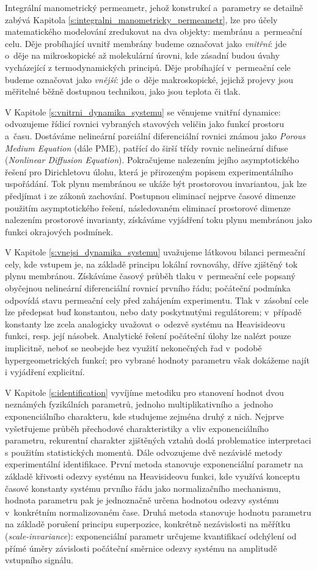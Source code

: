Integrální manometrický permeametr, jehož konstrukcí a~parametry se detailně zabývá Kapitola \ref{s:integralni_manometricky_permeametr}, lze pro účely matematického modelování zredukovat na dva objekty: membránu a~permeační celu. Děje probíhající uvnitř membrány budeme označovat jako \emph{vnitřní}: jde o~děje na mikroskopické až molekulární úrovni, kde zásadní budou úvahy vycházející z termodynamických principů. Děje probíhající v~permeační cele budeme označovat jako \emph{vnější}: jde o~děje makroskopické, jejichž projevy jsou měřitelné běžně dostupnou technikou, jako jsou teplota či tlak.

V Kapitole \ref{s:vnitrni_dynamika_systemu} se věnujeme vnitřní dynamice: odvozujeme řídicí rovnici vybraných stavových veličin jako funkcí prostoru a~času. Dostáváme nelineární parciální diferenciální rovnici známou jako \emph{Porous Medium Equation} (dále PME), patřící do širší třídy rovnic nelineární difuse (\emph{Nonlinear Diffusion Equation}). Pokračujeme nalezením jejího asymptotického řešení pro Dirichletovu úlohu, která je přirozeným popisem experimentálního uspořádání. Tok plynu membránou se ukáže být prostorovou invariantou, jak lze předjímat i ze zákonů zachování. Postupnou eliminací nejprve časové dimenze použitím asymptotického řešení, následovaném eliminací prostorové dimenze nalezením prostorové invarianty, získáváme vyjádření toku plynu membránou jako funkci okrajových podmínek. 

V Kapitole \ref{s:vnejsi_dynamika_systemu} uvažujeme látkovou bilanci permeační cely, kde vstupem je, na základě principu lokální rovnováhy, dříve zjištěný tok plynu membránou. Získáváme časový průběh tlaku v~permeační cele popsaný obyčejnou nelineární diferenciální rovnicí prvního řádu; počáteční podmínka odpovídá stavu permeační cely před zahájením experimentu. Tlak v~zásobní cele lze předepsat buď konstantou, nebo daty poskytnutými regulátorem; v~případě konstanty lze zcela analogicky uvažovat o~odezvě systému na Heavisideovu funkci, resp. její násobek. Analytické řešení počáteční úlohy lze nalézt pouze implicitně, neboť se neobejde bez využití nekonečných řad v~podobě hypergeometrických funkcí; pro vybrané hodnoty parametru však dokážeme najít i vyjádření explicitní.

V Kapitole \ref{s:identification} vyvíjíme metodiku pro stanovení hodnot dvou neznámých fyzikálních parametrů, jednoho multiplikativního a~jednoho exponenciálního charakteru, kde studujeme zejména druhý z nich. Nejprve vyšetřujeme průběh přechodové charakteristiky a vliv exponenciálního parametru, rekurentní charakter zjištěných vztahů dodá problematice interpretaci s použitím statistických momentů. Dále odvozujeme dvě nezávislé metody experimentální identifikace. První metoda stanovuje exponenciální parametr na základě křivosti odezvy systému na Heavisideovu funkci, kde využívá konceptu časové konstanty systému prvního řádu jako normalizačního mechanismu, hodnota parametru pak je jednoznačně určena hodnotou odezvy systému v~konkrétním normalizovaném čase. Druhá metoda stanovuje hodnotu parametru na základě porušení principu superpozice, konkrétně nezávislosti na měřítku (\emph{scale-invariance}): exponenciální parametr určujeme kvantifikací odchýlení od přímé úměry závislosti počáteční směrnice odezvy systému na amplitudě vstupního signálu.